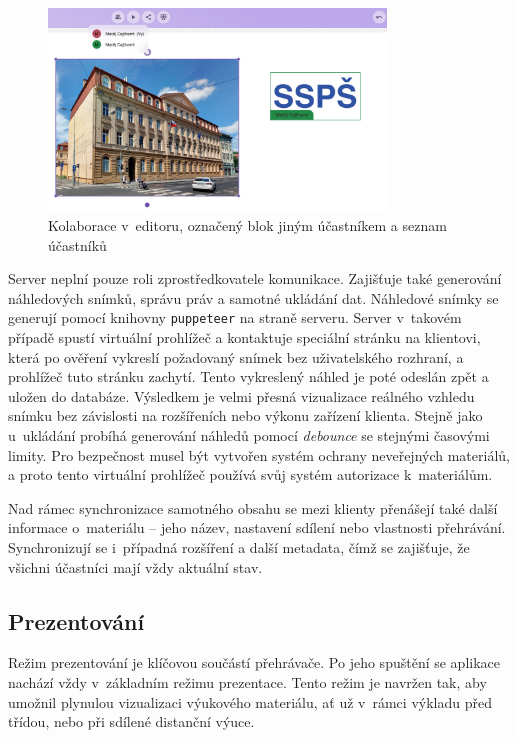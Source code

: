 \begin{figure}[ht!]
    \centering
    \includegraphics[width=0.8\textwidth]{media/05_realizace/kolaborace.png}
    \caption{Kolaborace v~editoru, označený blok jiným účastníkem a seznam účastníků}
    \label{fig:realizace/kolaborace}
\end{figure}


Server neplní pouze roli zprostředkovatele komunikace. 
Zajišťuje také generování náhledových snímků, správu práv a samotné ukládání dat.
Náhledové snímky se generují pomocí knihovny \texttt{puppeteer} na straně serveru. 
Server v~takovém případě spustí virtuální prohlížeč a kontaktuje speciální stránku na klientovi, která po ověření vykreslí požadovaný snímek bez uživatelského rozhraní, a prohlížeč tuto stránku zachytí. 
Tento vykreslený náhled je poté odeslán zpět a uložen do databáze. 
Výsledkem je velmi přesná vizualizace reálného vzhledu snímku bez závislosti na rozšířeních nebo výkonu zařízení klienta.
Stejně jako u~ukládání probíhá generování náhledů pomocí \textit{debounce} se stejnými časovými limity.
Pro bezpečnost musel být vytvořen systém ochrany neveřejných materiálů, a proto tento virtuální prohlížeč používá svůj systém autorizace k~materiálům.

Nad rámec synchronizace samotného obsahu se mezi klienty přenášejí také další informace o~materiálu -- jeho název, nastavení sdílení nebo vlastnosti přehrávání.
Synchronizují se i~případná rozšíření a další metadata, čímž se zajišťuje, že všichni účastníci mají vždy aktuální stav.

\subsection{Prezentování}


Režim prezentování je klíčovou součástí přehrávače. 
Po jeho spuštění se aplikace nachází vždy v~základním režimu prezentace. 
Tento režim je navržen tak, aby umožnil plynulou vizualizaci výukového materiálu, ať už v~rámci výkladu před třídou, nebo při sdílené distanční výuce.

